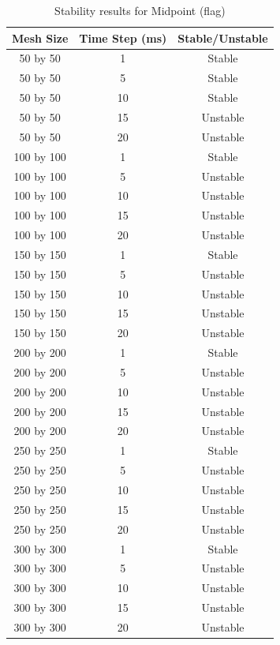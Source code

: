 \begin{table}[tp]
   \begin{minipage}{\textwidth}
      \begin{center}
         \begin{tabular}{c|c|c}
           Mesh Size & Time Step (ms) & Stable/Unstable\\
           \hline
           50 by 50 & 1 & Stable\\
           50 by 50 & 5 & Stable\\
           50 by 50 & 10 & Stable\\
           50 by 50 & 15 & Unstable\\
           50 by 50 & 20 & Unstable\\
           100 by 100 & 1 & Stable\\
           100 by 100 & 5 & Unstable\\
           100 by 100 & 10 & Unstable\\
           100 by 100 & 15 & Unstable\\
           100 by 100 & 20 & Unstable\\           
           150 by 150 & 1 & Stable\\
           150 by 150 & 5 & Unstable\\
           150 by 150 & 10 & Unstable\\
           150 by 150 & 15 & Unstable\\
           150 by 150 & 20 & Unstable\\           
           200 by 200 & 1 & Stable\\
           200 by 200 & 5 & Unstable\\
           200 by 200 & 10 & Unstable\\
           200 by 200 & 15 & Unstable\\
           200 by 200 & 20 & Unstable\\           
           250 by 250 & 1 & Stable\\
           250 by 250 & 5 & Unstable\\
           250 by 250 & 10 & Unstable\\
           250 by 250 & 15 & Unstable\\
           250 by 250 & 20 & Unstable\\           
           300 by 300 & 1 & Stable\\
           300 by 300 & 5 & Unstable\\
           300 by 300 & 10 & Unstable\\
           300 by 300 & 15 & Unstable\\
           300 by 300 & 20 & Unstable\\
         \end{tabular}
      \end{center}
   \end{minipage}
   \caption{Stability results for Midpoint (flag)}
   \label{tab:m stability flag}
\end{table}

